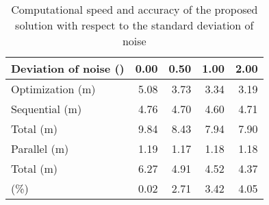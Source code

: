 \begin{table*}
  \centering
  \caption{
    Computational speed and accuracy of the proposed solution with respect to
    the standard deviation of noise
  }
  \ttfamily
  \begin{tabular}{lrrrr}
    \toprule
    \textnormal{Deviation of noise (\celsius{})} & 0.00 & 0.50 & 1.00 & 2.00 \\
    \midrule
    \textnormal{Optimization (m)}                & 5.08 & 3.73 & 3.34 & 3.19 \\
    \midrule
    \textnormal{Sequential (m)}                  & 4.76 & 4.70 & 4.60 & 4.71 \\
    \textnormal{Total (m)}                       & 9.84 & 8.43 & 7.94 & 7.90 \\
    \midrule
    \textnormal{Parallel (m)}                    & 1.19 & 1.17 & 1.18 & 1.18 \\
    \textnormal{Total (m)}                       & 6.27 & 4.91 & 4.52 & 4.37 \\
    \midrule
    \textnormal{\up{NRMSE} (\%)}                 & 0.02 & 2.71 & 3.42 & 4.05 \\
    \bottomrule
  \end{tabular}
\end{table*}
